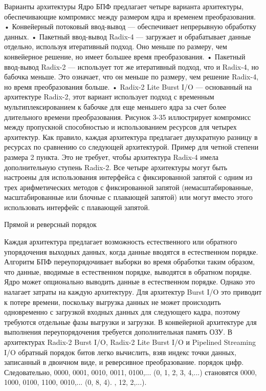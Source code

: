 Варианты архитектуры
Ядро БПФ предлагает четыре варианта архитектуры, обеспечивающие компромисс между размером ядра и временем преобразования. • Конвейерный потоковый ввод-вывод — обеспечивает непрерывную обработку данных. • Пакетный ввод-вывод Radix-4 — загружает и обрабатывает данные отдельно, используя итеративный подход. Оно меньше по размеру, чем конвейерное решение, но имеет большее время преобразования. • Пакетный ввод-вывод Radix-2 — использует тот же итеративный подход, что и Radix-4, но бабочка меньше. Это означает, что он меньше по размеру, чем решение Radix-4, но время преобразования больше. • Radix-2 Lite Burst I/O — основанный на архитектуре Radix-2, этот вариант использует подход с временным мультиплексированием к бабочке для еще меньшего ядра за счет более длительного времени преобразования. Рисунок 3-35 иллюстрирует компромисс между пропускной способностью и использованием ресурсов для четырех архитектур. Как правило, каждая архитектура предлагает двухкратную разницу в ресурсах по сравнению со следующей архитектурой. Пример для четной степени размера 2 пункта. Это не требует, чтобы архитектура Radix-4 имела дополнительную ступень Radix-2. Все четыре архитектуры могут быть настроены для использования интерфейса с фиксированной запятой с одним из трех арифметических методов с фиксированной запятой (немасштабированные, масштабированные или блочные с плавающей запятой) или могут вместо этого использовать интерфейс с плавающей запятой.

Прямой и реверсный порядок

Каждая архитектура предлагает возможность естественного или обратного упорядочения выходных данных, когда данные вводятся в естественном порядке. Алгоритм БПФ переупорядочивает выборки во время обработки таким образом, что данные, вводимые в естественном порядке, выводятся в обратном порядке. Ядро может опционально выводить данные в естественном порядке. Однако это налагает затраты на каждую архитектуру. Для архитектур Burst I/O это приводит к потере времени, поскольку выгрузка данных не может происходить одновременно с загрузкой входных данных для следующего кадра, поэтому требуются отдельные фазы выгрузки и загрузки. В конвейерной архитектуре для выполнения переупорядочения требуется дополнительная память ОЗУ. В архитектурах Radix-2 Burst I/O, Radix-2 Lite Burst I/O и Pipelined Streaming I/O обратный порядок битов легко вычислить, взяв индекс точки данных, записанный в двоичном виде, и реверсивное преобразование. порядок цифр. Следовательно, 0000, 0001, 0010, 0011, 0100,... (0, 1, 2, 3, 4,...) становятся 0000, 1000, 0100, 1100, 0010,... (0, 8, 4). , 12, 2,...).

